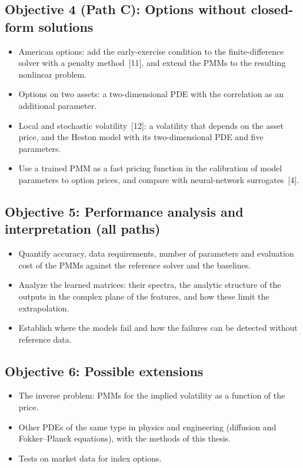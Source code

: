 \documentclass[12pt,a4paper]{article}
\begin{document}
\subsection*{Objective 4 (Path C): Options without closed-form solutions}
\begin{itemize}
    \item American options: add the early-exercise condition to the
    finite-difference solver with a penalty method~[11], and extend
    the PMMs to the resulting nonlinear problem.
    \item Options on two assets: a two-dimensional PDE with the
    correlation as an additional parameter.
    \item Local and stochastic volatility~[12]: a volatility that
    depends on the asset price, and the Heston model with its
    two-dimensional PDE and five parameters.
    \item Use a trained PMM as a fast pricing function in the
    calibration of model parameters to option prices, and compare
    with neural-network surrogates~[4].
\end{itemize}

\subsection*{Objective 5: Performance analysis and interpretation (all paths)}
\begin{itemize}
    \item Quantify accuracy, data requirements, number of parameters
    and evaluation cost of the PMMs against the reference solver and
    the baselines.
    \item Analyze the learned matrices: their spectra, the analytic
    structure of the outputs in the complex plane of the features,
    and how these limit the extrapolation.
    \item Establish where the models fail and how the failures can be
    detected without reference data.
\end{itemize}

\subsection*{Objective 6: Possible extensions}
\begin{itemize}
    \item The inverse problem: PMMs for the implied volatility as a
    function of the price.
    \item Other PDEs of the same type in physics and engineering
    (diffusion and Fokker--Planck equations), with the methods of this
    thesis.
    \item Tests on market data for index options.
\end{itemize}
\end{document}
